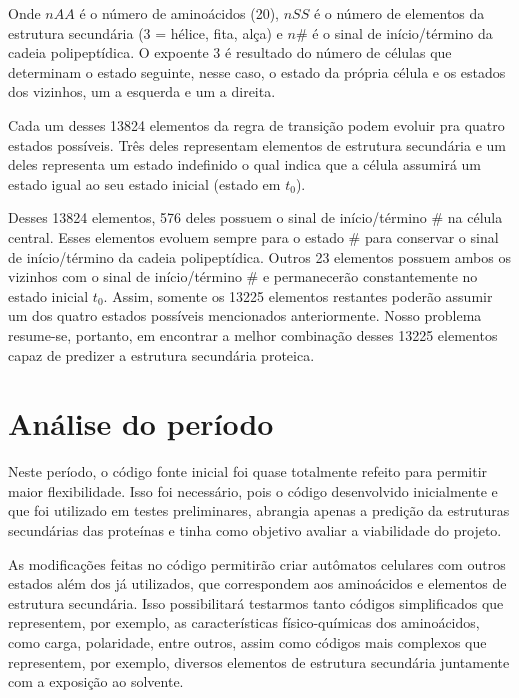 Onde $nAA$ é o número de aminoácidos (20), $nSS$ é o número de elementos da estrutura secundária (3 = hélice, fita, alça) e $n\#$ é o sinal de início/término da cadeia polipeptídica. O expoente 3 é resultado do número de células que determinam o estado seguinte, nesse caso, o estado da própria célula e os estados dos vizinhos, um a esquerda e um a direita. 

Cada um desses 13824 elementos da regra de transição podem evoluir pra quatro estados possíveis. Três deles representam elementos de estrutura secundária e um deles representa um estado indefinido o qual indica que a célula assumirá um estado igual ao seu estado inicial (estado em $t_{0}$).

Desses 13824 elementos, 576 deles possuem o sinal de início/término $\#$ na célula central. Esses elementos evoluem sempre para o estado $\#$ para conservar o sinal de início/término da cadeia polipeptídica. Outros 23 elementos possuem ambos os vizinhos com o sinal de início/término $\#$ e permanecerão constantemente no estado inicial $t_{0}$. Assim, somente os 13225 elementos restantes poderão assumir um dos quatro estados possíveis mencionados anteriormente. Nosso problema resume-se, portanto, em encontrar a melhor combinação desses 13225 elementos capaz de predizer a estrutura secundária proteica. 


\section{Análise do período}
Neste período, o código fonte inicial foi quase totalmente refeito para permitir maior flexibilidade. Isso foi necessário, pois o código desenvolvido inicialmente e que foi utilizado em testes preliminares, abrangia apenas a predição da estruturas secundárias das proteínas e tinha como objetivo avaliar a viabilidade do projeto. 

As modificações feitas no código permitirão criar autômatos celulares com outros estados além dos já utilizados, que correspondem aos aminoácidos e  elementos de estrutura secundária. Isso possibilitará testarmos tanto códigos simplificados que representem, por exemplo, as características físico-químicas dos aminoácidos, como carga, polaridade, entre outros, assim como códigos mais complexos que representem, por exemplo, diversos elementos de estrutura secundária juntamente com a exposição ao solvente.

